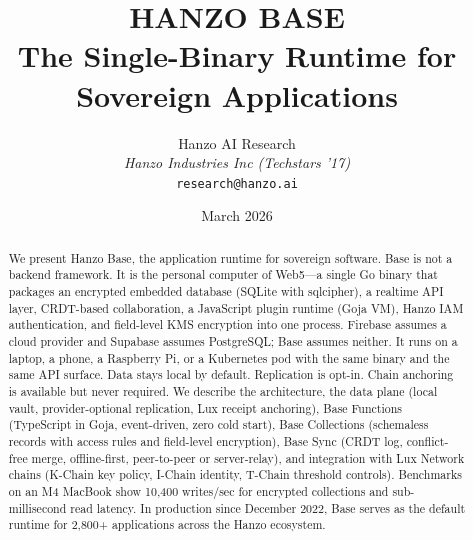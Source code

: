 \documentclass[11pt]{article}
\title{HANZO BASE\\[0.3em]
{\large The Single-Binary Runtime for\\Sovereign Applications}}
\author{
    Hanzo AI Research \\
    \textit{Hanzo Industries Inc (Techstars '17)} \\
    \texttt{research@hanzo.ai}
}
\date{March 2026}
\begin{document}
\hanzocoverpage

\begin{abstract}
We present Hanzo Base, the application runtime for sovereign software. Base is
not a backend framework. It is the personal computer of Web5---a single Go
binary that packages an encrypted embedded database (SQLite with sqlcipher), a
realtime API layer, CRDT-based collaboration, a JavaScript plugin runtime
(Goja VM), Hanzo IAM authentication, and field-level KMS encryption into one
process. Firebase assumes a cloud provider and Supabase assumes PostgreSQL;
Base assumes neither. It runs on a
laptop, a phone, a Raspberry Pi, or a Kubernetes pod with the same binary and
the same API surface. Data stays local by default. Replication is opt-in.
Chain anchoring is available but never required. We describe the architecture,
the data plane (local vault, provider-optional replication, Lux receipt
anchoring), Base Functions (TypeScript in Goja, event-driven, zero cold start),
Base Collections (schemaless records with access rules and field-level
encryption), Base Sync (CRDT log, conflict-free merge, offline-first,
peer-to-peer or server-relay), and integration with Lux Network
chains (K-Chain key policy, I-Chain identity, T-Chain threshold controls).
Benchmarks on an M4 MacBook show 10,400 writes/sec for encrypted collections
and sub-millisecond read latency. In production since December 2022, Base
serves as the default runtime for 2,800+ applications across the Hanzo
ecosystem.
\end{abstract}
















\end{document}
